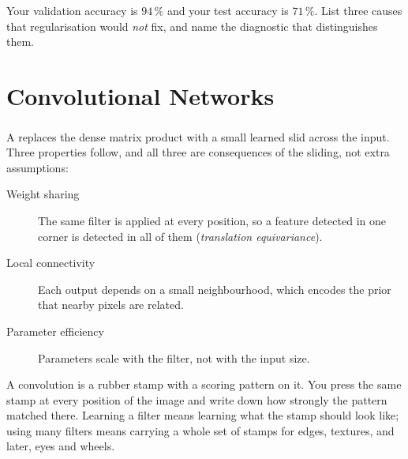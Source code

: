 \begin{checkpoint}
Your validation accuracy is $94\,\%$ and your test accuracy is $71\,\%$. List
three causes that regularisation would \emph{not} fix, and name the diagnostic
that distinguishes them.
\end{checkpoint}

\section{Convolutional Networks}

A  replaces the dense matrix product with
a small learned  slid across the
input\textsuperscript{\cite[][pp.~43--48]{fleuretLittleBookDeep}}. Three
properties follow, and all three are consequences of the sliding, not extra
assumptions:

\begin{description}
  \item[Weight sharing] The same filter is applied at every position, so a
    feature detected in one corner is detected in all of them
    (\emph{translation equivariance}).
  \item[Local connectivity] Each output depends on a small neighbourhood, which
    encodes the prior that nearby pixels are related.
  \item[Parameter efficiency] Parameters scale with the filter, not with the
    input size.
\end{description}

\begin{plainlanguage}
A convolution is a rubber stamp with a scoring pattern on it. You press the same
stamp at every position of the image and write down how strongly the pattern
matched there. Learning a filter means learning what the stamp should look like;
using many filters means carrying a whole set of stamps for edges, textures,
and later, eyes and wheels.
\end{plainlanguage}

